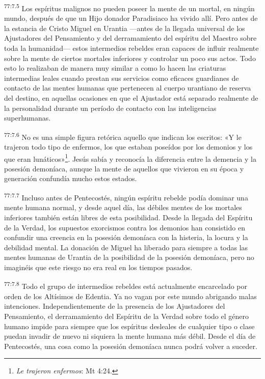\par
\textsuperscript{77:7.5} Los espíritus malignos no pueden poseer la mente de un mortal, en ningún mundo, después de que un Hijo donador Paradisiaco ha vivido allí. Pero antes de la estancia de Cristo Miguel en Urantia ---antes de la llegada universal de los Ajustadores del Pensamiento y del derramamiento del espíritu del Maestro sobre toda la humanidad--- estos intermedios rebeldes eran capaces de influir realmente sobre la mente de ciertos mortales inferiores y controlar un poco sus actos. Todo esto lo realizaban de manera muy similar a como lo hacen las criaturas intermedias leales cuando prestan sus servicios como eficaces guardianes de contacto de las mentes humanas que pertenecen al cuerpo urantiano de reserva del destino, en aquellas ocasiones en que el Ajustador está separado realmente de la personalidad durante un período de contacto con las inteligencias superhumanas.

\par
\textsuperscript{77:7.6} No es una simple figura retórica aquello que indican los escritos: «Y le trajeron todo tipo de enfermos, los que estaban poseídos por los demonios y los que eran lunáticos»\footnote{\textit{Le trajeron enfermos}: Mt 4:24.}. Jesús sabía y reconocía la diferencia entre la demencia y la posesión demoníaca, aunque la mente de aquellos que vivieron en su época y generación confundía mucho estos estados.

\par
\textsuperscript{77:7.7} Incluso antes de Pentecostés, ningún espíritu rebelde podía dominar una mente humana normal, y desde aquel día, las débiles mentes de los mortales inferiores también están libres de esta posibilidad. Desde la llegada del Espíritu de la Verdad, los supuestos exorcismos contra los demonios han consistido en confundir una creencia en la posesión demoníaca con la histeria, la locura y la debilidad mental. La donación de Miguel ha liberado para siempre a todas las mentes humanas de Urantia de la posibilidad de la posesión demoníaca, pero no imaginéis que este riesgo no era real en los tiempos pasados.

\par
\textsuperscript{77:7.8} Todo el grupo de intermedios rebeldes está actualmente encarcelado por orden de los Altísimos de Edentia. Ya no vagan por este mundo abrigando malas intenciones. Independientemente de la presencia de los Ajustadores del Pensamiento, el derramamiento del Espíritu de la Verdad sobre todo el género humano impide para siempre que los espíritus desleales de cualquier tipo o clase puedan invadir de nuevo ni siquiera la mente humana más débil. Desde el día de Pentecostés, una cosa como la posesión demoníaca nunca podrá volver a suceder.

